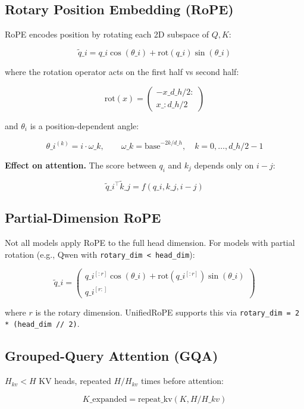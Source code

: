 \subsection{Rotary Position Embedding (RoPE)}

RoPE encodes position by rotating each 2D subspace of $Q, K$:

\[
\tilde{q}\_i = q\_i \cos(\theta\_i) + \mathrm{rot}(q\_i) \sin(\theta\_i)
\tag{3.2}
\]

where the rotation operator acts on the first half vs second half:

\[
\mathrm{rot}(x) = \begin{pmatrix} -x\_{d\_h/2:} \\ x\_{:d\_h/2} \end{pmatrix}
\tag{3.3}
\]

and $\theta_i$ is a position-dependent angle:

\[
\theta\_i^{(k)} = i \cdot \omega\_k, \qquad
\omega\_k = \mathrm{base}^{-2k/d\_h}, \quad k = 0, \dots, d\_h/2 - 1
\tag{3.4}
\]

\textbf{Effect on attention.} The score between $q_i$ and $k_j$ depends only on 
$i - j$:

\[
\tilde{q}\_i^\top \tilde{k}\_j = f(q\_i, k\_j, i - j)
\tag{3.5}
\]

\subsection{Partial-Dimension RoPE}

Not all models apply RoPE to the full head dimension. For models with 
partial rotation (e.g., Qwen with \texttt{rotary\_dim \textless{} head\_dim}):

\[
\tilde{q}\_i = \begin{pmatrix} q\_i^{[:r]} \cos(\theta\_i) + \mathrm{rot}(q\_i^{[:r]}) \sin(\theta\_i) \\ q\_i^{[r:]} \end{pmatrix}
\tag{3.6}
\]

where $r$ is the rotary dimension. UnifiedRoPE supports this via 
\texttt{rotary\_dim = 2 * (head\_dim // 2)}.

\subsection{Grouped-Query Attention (GQA)}

$H_{kv} < H$ KV heads, repeated $H / H_{kv}$ times before attention:

\[
K\_\text{expanded} = \mathrm{repeat\_kv}(K, H / H\_{kv})
\tag{3.7}
\]

